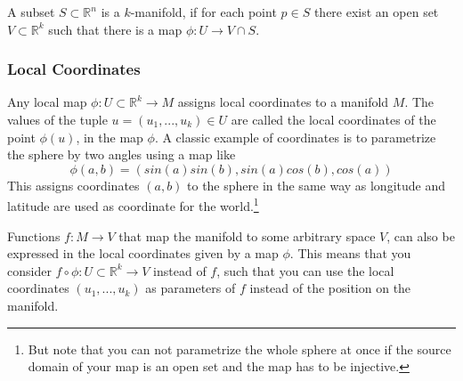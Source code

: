 \begin{definition}[Manifold] A subset $S\subset \mathbb R^n$ is a $k$-manifold, if for each point $p \in S$ there exist an open set $V\subset \mathbb R^k$ such that there is a map $\phi: U \rightarrow  V\cap S$.
\end{definition} 

\subsubsection{Local Coordinates}

Any local map $\phi: U \subset \mathbb R^k \rightarrow M$ assigns local coordinates to a manifold $M$. The values of the tuple $u=(u_1,...,u_k)\in U$ are called the local coordinates of the point $\phi(u)$, in the map $\phi$. A classic example of coordinates is to parametrize the sphere by two angles using a map like
\[\phi(a,b) = (sin(a)sin(b), sin(a)cos(b), cos(a))\]
This assigns coordinates $(a,b)$ to the sphere in the same way as longitude and latitude are used as coordinate for the world.\footnote{But note that you can not parametrize the whole sphere at once if the source domain of your map is an open set and the map has to be injective.}

Functions $f:M \rightarrow V$ that map the manifold to some arbitrary space $V$, can also be expressed in the local coordinates given by  a map $\phi$. This means that you consider $f \circ \phi : U \subset \mathbb R^k \rightarrow V$ instead of $f$, such that you can use the local coordinates $(u_1,...,u_k)$ as parameters of $f$ instead of the position on the manifold. %

%
%
%
%

